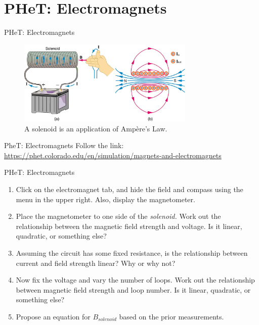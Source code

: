 \documentclass{beamer}
\begin{document}
\section{PHeT: Electromagnets}

\begin{frame}{PHeT: Electromagnets}
\begin{figure}
\centering
\includegraphics[width=0.75\textwidth]{figures/solenoid.jpeg}
\caption{\label{fig:solenoid1} A solenoid is an application of Amp\`{e}re's Law.}
\end{figure}
\end{frame}

\begin{frame}{PheT: Electromagnets}
Follow the link: \\ \vspace{0.5cm}
\url{https://phet.colorado.edu/en/simulation/magnets-and-electromagnets}
\end{frame}

\begin{frame}{PHeT: Electromagnets}
\small
\begin{enumerate}
\item Click on the electromagnet tab, and hide the field and compass using the menu in the upper right.  Also, display the magnetometer.
\item Place the magnetometer to one side of the \textit{solenoid.}  Work out the relationship between the magnetic field strength and voltage.  Is it linear, quadratic, or something else?
\item Assuming the circuit has some fixed resistance, is the relationship between current and field strength linear?  Why or why not?
\item Now fix the voltage and vary the number of loops.  Work out the relationship between magnetic field strength and loop number.  Is it linear, quadratic, or something else?
\item Propose an equation for $B_{solenoid}$ based on the prior measurements.
\end{enumerate}
\end{frame}
\end{document}
